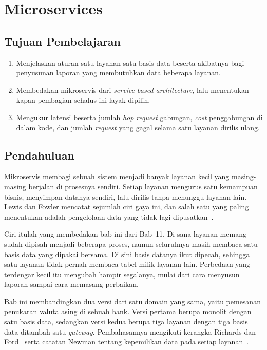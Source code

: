 \chapter{Microservices}
\label{bab:mikroservis}

\section*{Tujuan Pembelajaran}

\begin{enumerate}
  \item Menjelaskan aturan satu layanan satu basis data beserta akibatnya bagi
    penyusunan laporan yang membutuhkan data beberapa layanan.
  \item Membedakan mikroservis dari \textit{service-based architecture}, lalu
    menentukan kapan pembagian sehalus ini layak dipilih.
  \item Mengukur latensi beserta jumlah \textit{hop} \textit{request} gabungan, \textit{cost}
    penggabungan di dalam kode, dan jumlah \textit{request} yang gagal selama satu
    layanan dirilis ulang.
\end{enumerate}

\section{Pendahuluan}

Mikroservis membagi sebuah sistem menjadi banyak layanan kecil yang
masing-masing
berjalan di prosesnya sendiri. Setiap layanan mengurus satu kemampuan bisnis,
menyimpan datanya sendiri, lalu dirilis tanpa menunggu layanan lain. Lewis dan
Fowler mencatat sejumlah ciri gaya ini, dan salah satu yang paling menentukan
adalah pengelolaan data yang tidak lagi dipusatkan~\cite{lewis2014microservices}.

Ciri itulah yang membedakan bab ini dari Bab~11. Di sana layanan memang sudah
dipisah menjadi beberapa proses, namun seluruhnya masih membaca satu basis data
yang dipakai bersama. Di sini basis datanya ikut dipecah, sehingga satu layanan
tidak pernah membaca tabel milik layanan lain. Perbedaan yang terdengar kecil
itu mengubah hampir segalanya, mulai dari cara menyusun laporan sampai cara
memasang perbaikan.

Bab ini membandingkan dua versi dari satu domain yang sama, yaitu pemesanan
penukaran valuta asing di sebuah bank. Versi pertama berupa monolit
dengan satu
basis data, sedangkan versi kedua berupa tiga layanan dengan tiga basis data
ditambah satu \textit{gateway}. Pembahasannya mengikuti kerangka Richards dan
Ford~\cite{richards2020fundamentals} serta catatan Newman tentang kepemilikan
data pada setiap layanan~\cite{newman2021building}.

